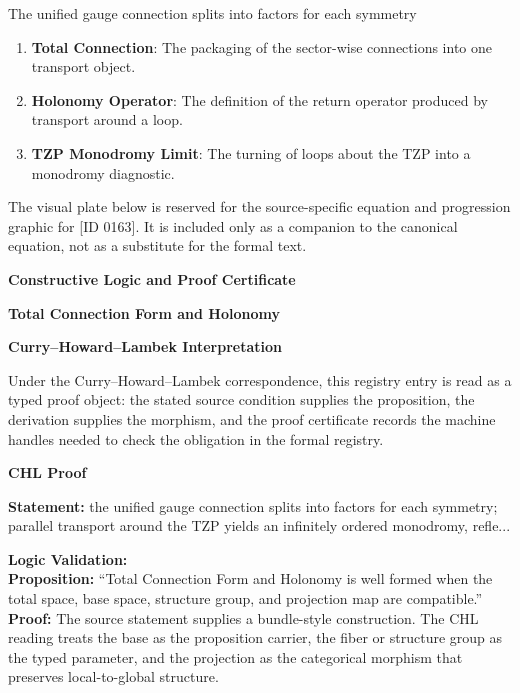 The unified gauge connection splits into factors for each symmetry
\endgroup

\begin{enumerate}[leftmargin=1.6em,itemsep=6pt,topsep=4pt]
\item \textbf{Total Connection}: The packaging of the sector-wise connections into one transport object.
\item \textbf{Holonomy Operator}: The definition of the return operator produced by transport around a loop.
\item \textbf{TZP Monodromy Limit}: The turning of loops about the TZP into a monodromy diagnostic.
\end{enumerate}

\begingroup\footnotesize\sloppy
The visual plate below is reserved for the source-specific equation and progression graphic for [ID 0163]. It is included only as a companion to the canonical equation, not as a substitute for the formal text.
\par\endgroup
\ifTZPDarkEdition
{}
\fi

\clearpage
\begingroup\tzpsupportsetup
\noindent\textbf{\fontsize{10.8pt}{12.8pt}\selectfont [ID 0163] Constructive Logic and Proof Certificate}\par
\noindent\textbf{\fontsize{10pt}{12pt}\selectfont Total Connection Form and Holonomy}\par
\vspace{0.45em}
\begingroup
\footnotesize
\setlength{\parskip}{0.22em}
\setlength{\parindent}{0pt}
\noindent\textbf{Curry--Howard--Lambek Interpretation}\par
Under the Curry--Howard--Lambek correspondence, this registry entry is read as a typed proof
object: the stated source condition supplies the proposition, the derivation supplies the
morphism, and the proof certificate records the machine handles needed to check the obligation
in the formal registry.

\vspace{0.45em}
\noindent\textbf{CHL Proof}\par
\textbf{Statement:} the unified gauge connection splits into factors for each symmetry; parallel transport
around the TZP yields an infinitely ordered monodromy, refle...

\textbf{Logic Validation:}\\
\textbf{Proposition:} ``Total Connection Form and Holonomy is well formed when the total space, base space,
structure group, and projection map are compatible.''\\
\textbf{Proof:} The source statement supplies a bundle-style construction. The CHL reading treats the
base as the proposition carrier, the fiber or structure group as the typed parameter,
and the projection as the categorical morphism that preserves local-to-global structure.

